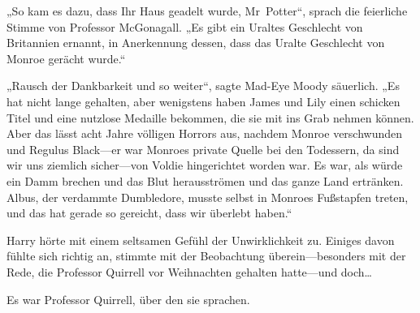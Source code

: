 „So kam es dazu, dass Ihr Haus geadelt wurde, Mr~Potter“, sprach die feierliche Stimme von Professor McGonagall. „Es gibt ein Uraltes Geschlecht von Britannien ernannt, in Anerkennung dessen, dass das Uralte Geschlecht von Monroe gerächt wurde.“

„Rausch der Dankbarkeit und so weiter“, sagte Mad-Eye Moody säuerlich. „Es hat nicht lange gehalten, aber wenigstens haben James und Lily einen schicken Titel und eine nutzlose Medaille bekommen, die sie mit ins Grab nehmen können. Aber das lässt acht Jahre völligen Horrors aus, nachdem Monroe verschwunden und Regulus Black—er war Monroes private Quelle bei den Todessern, da sind wir uns ziemlich sicher—von Voldie hingerichtet worden war. Es war, als würde ein Damm brechen und das Blut herausströmen und das ganze Land ertränken. Albus, der verdammte Dumbledore, musste selbst in Monroes Fußstapfen treten, und das hat gerade so gereicht, dass wir überlebt haben.“

Harry hörte mit einem seltsamen Gefühl der Unwirklichkeit zu. Einiges davon fühlte sich richtig an, stimmte mit der Beobachtung überein—besonders mit der Rede, die Professor Quirrell vor Weihnachten gehalten hatte—und doch…

Es war Professor Quirrell, über den sie sprachen.

